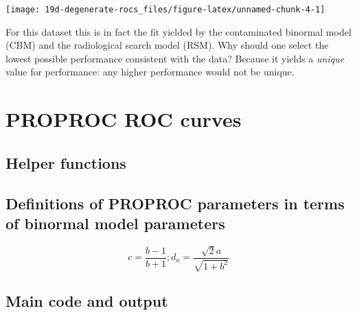 \documentclass[
]{book}
\begin{document}
\begin{center}\texttt{[image: 19d-degenerate-rocs\_files/figure-latex/unnamed-chunk-4-1]} \end{center}

For this dataset this is in fact the fit yielded by the contaminated binormal model (CBM) and the radiological search model (RSM). Why should one select the lowest possible performance consistent with the data? Because it yields a \emph{unique} value for performance: any higher performance would not be unique.

\hypertarget{proproc-rocs}{%
\chapter{PROPROC ROC curves}\label{proproc-rocs}}

\hypertarget{helper-functions}{%
\section{Helper functions}\label{helper-functions}}

\hypertarget{definitions-of-proproc-parameters-in-terms-of-binormal-model-parameters}{%
\section{Definitions of PROPROC parameters in terms of binormal model parameters}\label{definitions-of-proproc-parameters-in-terms-of-binormal-model-parameters}}

\[c=\frac{b-1}{b+1};{{d}_{a}}=\frac{\sqrt{2}a}{\sqrt{1+{{b}^{2}}}}\]

\hypertarget{main-code-and-output}{%
\section{Main code and output}\label{main-code-and-output}}
\end{document}
